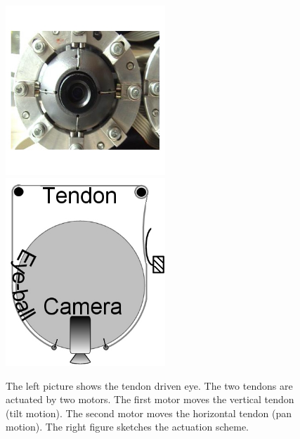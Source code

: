 \begin{figure}[h!tbp]
  \centering
  \includegraphics[width=60mm]{Figure/EyePhoto.jpg}
  \includegraphics[width=60mm]{Figure/EyeSection.jpg}\\
  \caption{The left picture shows the tendon driven eye. The
 two tendons are actuated by two motors. The first motor moves the vertical
  tendon (tilt motion). The second motor moves the horizontal tendon (pan motion). The
  right figure sketches the actuation scheme.}\label{Fig:EyeSection}
\end{figure}

